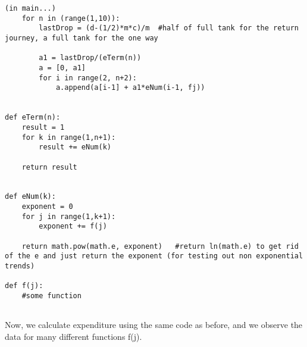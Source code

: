 \documentclass{homework}
\begin{document}
\begin{lstlisting}
(in main...)
    for n in (range(1,10)):
        lastDrop = (d-(1/2)*m*c)/m  #half of full tank for the return journey, a full tank for the one way

        a1 = lastDrop/(eTerm(n))
        a = [0, a1]
        for i in range(2, n+2):
            a.append(a[i-1] + a1*eNum(i-1, fj))


def eTerm(n):
    result = 1
    for k in range(1,n+1):
        result += eNum(k)

    return result


def eNum(k):
    exponent = 0
    for j in range(1,k+1):
        exponent += f(j)
    
    return math.pow(math.e, exponent)   #return ln(math.e) to get rid of the e and just return the exponent (for testing out non exponential trends)

def f(j):
    #some function
    
\end{lstlisting}
Now, we calculate expenditure using the same code as before, and we observe the data for many different functions f(j).
\newline\newline
\end{document}
